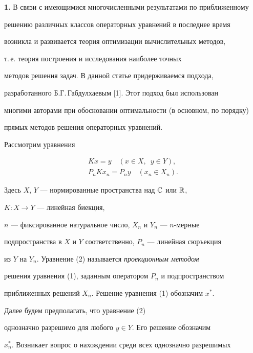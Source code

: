 \label{begin}








{\bf 1.} В связи с имеющимися многочисленными результатами по приближенному


решению различных классов операторных уравнений в последнее время


возникла и развивается теория оптимизации вычислительных методов,


т.\,е. теория построения и исследования наиболее точных


методов решения задач. В данной статье придерживаемся подхода,


разработанного Б.Г.\,Габдулхаевым [1]. Этот подход был использован


многими авторами при обосновании оптимальности (в основном, по порядку)


прямых методов решения операторных уравнений.





Рассмотрим уравнения


\begin{gather}


Kx=y \quad (x\in X,\ \; y\in Y),\\


P_nKx_n=P_ny \quad (x_n\in X_n).


\end{gather}


Здесь $X$, $Y$ --- нормированные пространства над $\Bbb C$ или $\Bbb R$,


$K:X \rightarrow Y$ --- линейная биекция,


$n$ --- фиксированное натуральное число, $X_n$ и $Y_n$ --- $n$-мерные


подпространства в $X$ и $Y$ соответственно, $P_n$ --- линейная сюръекция


из $Y$ на $Y_n$. Уравнение (2) называется {\it проекционным методом}


решения уравнения (1), заданным оператором $P_n$ и подпространством


приближенных решений $X_n$. Решение уравнения (1) обозначим $x^*$.


Далее будем предполагать, что уравнение (2)


однозначно разрешимо для любого $y \in Y$. Его решение обозначим


$x_n^*$. Возникает вопрос о нахождении среди всех однозначно разрешимых


